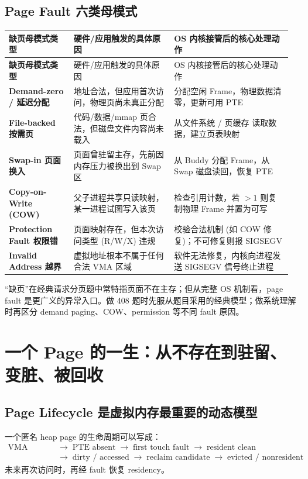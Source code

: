 \documentclass[11pt,a4paper]{ctexart}
\newcommand{\arr}{\;\longrightarrow\;}
\begin{document}
\subsection{Page Fault 六类母模式}
\begingroup
\small
\renewcommand{\arraystretch}{1.25}
\begin{longtable}{>{\bfseries}p{0.22\linewidth} p{0.34\linewidth} p{0.4\linewidth}}
\toprule
缺页母模式类型 & 硬件/应用触发的具体原因 & OS 内核接管后的核心处理动作\\
\midrule
\endfirsthead
\toprule
缺页母模式类型 & 硬件/应用触发的具体原因 & OS 内核接管后的核心处理动作\\
\midrule
\endhead
Demand-zero / 延迟分配 & 地址合法，但应用首次访问，物理页尚未真正分配 & 分配空闲 Frame，物理数据清零，更新可用 PTE\\
File-backed 按需页 & 代码/数据/mmap 页合法，但磁盘文件内容尚未载入 & 从文件系统 / 页缓存 读取数据，建立页表映射\\
Swap-in 页面换入 & 页面曾驻留主存，先前因内存压力被换出到 Swap 区 & 从 Buddy 分配 Frame，从 Swap 磁盘读回，恢复 PTE\\
Copy-on-Write (COW) & 父子进程共享只读映射，某一进程试图写入该页 & 检查引用计数，若 $>1$ 则复制物理 Frame 并置为可写\\
Protection Fault 权限错 & 页面映射存在，但本次访问类型 (R/W/X) 违规 & 校验合法机制 (如 COW 修复)；不可修复则报 SIGSEGV\\
Invalid Address 越界 & 虚拟地址根本不属于任何合法 VMA 区域 & 软件无法修复，内核向进程发送 SIGSEGV 信号终止进程\\
\bottomrule
\end{longtable}
\endgroup

\begin{exam}
“缺页”在经典请求分页题中常特指页面不在主存；但从完整 OS 机制看，page fault 是更广义的异常入口。做 408 题时先服从题目采用的经典模型；做系统理解时再区分 demand paging、COW、permission 等不同 fault 原因。
\end{exam}

\section{一个 Page 的一生：从不存在到驻留、变脏、被回收}

\subsection{Page Lifecycle 是虚拟内存最重要的动态模型}
一个匿名 heap page 的生命周期可以写成：
\[
\boxed{
\begin{aligned}
\text{VMA exists} &\arr \text{PTE absent} \arr \text{first touch fault} \arr \text{resident clean} \\
&\arr \text{dirty / accessed} \arr \text{reclaim candidate} \arr \text{evicted / nonresident}
\end{aligned}
}
\]
未来再次访问时，再经 fault 恢复 residency。
\end{document}
